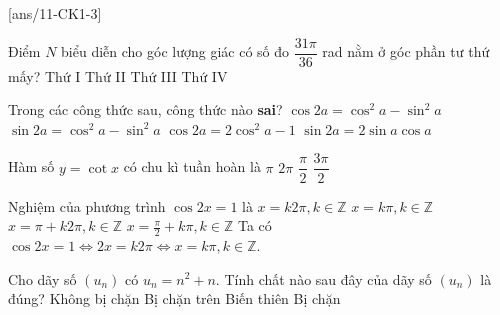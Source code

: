 \begin{name}
	{\tenchude}
	{\tendethi}
	{\tentruong}
	{\thoigian}
\end{name}
\caulc
{}[ans/11-CK1-3]
\begin{ex}%
	Điểm $N$ biểu diễn cho góc lượng giác có số đo $\dfrac{31\pi}{36}$ rad nằm ở góc phần tư thứ mấy?
	\choice
	{Thứ I}
	{\True Thứ II}
	{Thứ III}
	{Thứ IV}
\end{ex}

\begin{ex}%
	Trong các công thức sau, công thức nào \textbf{sai}?
	\choice
	{$\cos 2a={\cos ^2}a-{\sin ^2}a$}
	{\True $\sin 2a={\cos ^2}a-{\sin ^2}a$}
	{$\cos 2a = 2{\cos ^2}a-1$}
	{$\sin 2a=2\sin a\cos a$}
\end{ex}

\begin{ex}%
	Hàm số $y=\cot x$ có chu kì tuần hoàn là
	\choice
	{\True $\pi$}
	{$2\pi$}
	{$\dfrac{\pi}{2}$}
	{$\dfrac{3\pi}{2}$}
\end{ex}

\begin{ex}%
Nghiệm của phương trình $\cos 2x=1$ là
\choice
{$x=k2\pi, k\in \mathbb{Z}$}
{\True $x=k\pi, k\in \mathbb{Z}$}
{$x=\pi+k 2\pi, k\in \mathbb{Z}$}
{$x=\frac{\pi}{2}+k\pi, k\in \mathbb{Z}$}
\loigiai
{Ta có $\cos 2x=1 \Leftrightarrow 2x=k2\pi \Leftrightarrow x=k\pi,k\in \mathbb{Z}$.
}
\end{ex}

\begin{ex}%
	Cho dãy số $(u_n)$ có $u_n=n^2+n$. Tính chất nào sau đây của dãy số $(u_n)$ là đúng?	
	\choice
	{\True Không bị chặn}
	{Bị chặn trên}
	{Biến thiên}
	{Bị chặn}
\end{ex}

